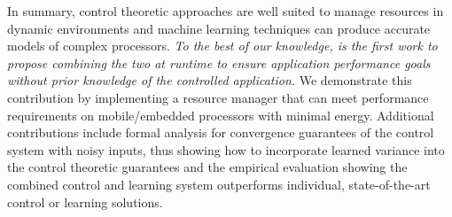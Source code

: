 In summary, control theoretic approaches are well suited to manage
resources in dynamic environments and machine learning techniques can
produce accurate models of complex processors.  \emph{To the best of
  our knowledge, \SYSTEM{} is the first work to propose combining the
  two at runtime to ensure application performance goals without prior
  knowledge of the controlled application.}  We demonstrate this
contribution by implementing a resource manager that can meet
performance requirements on mobile/embedded processors with minimal
energy.  Additional contributions include formal analysis for convergence guarantees of the control system with noisy inputs, thus showing how
to incorporate learned variance into the control theoretic guarantees
and the empirical evaluation showing the combined control and learning
system outperforms individual, state-of-the-art control or learning
solutions.


